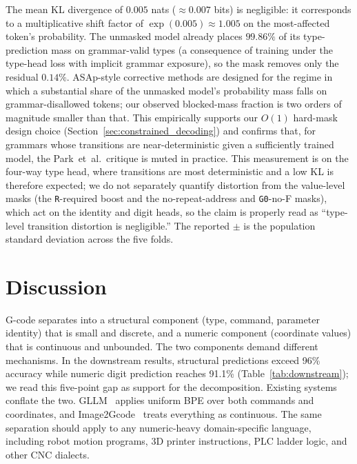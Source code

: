 \documentclass[sensors,article,submit,moreauthors,pdftex]{Definitions/mdpi}
\begin{document}
The mean KL divergence of $0.005$ nats ($\approx 0.007$ bits) is negligible: it corresponds to a multiplicative shift factor of $\exp(0.005) \approx 1.005$ on the most-affected token's probability. The unmasked model already places $99.86\%$ of its type-prediction mass on grammar-valid types (a consequence of training under the type-head loss with implicit grammar exposure), so the mask removes only the residual $0.14\%$. ASAp-style corrective methods are designed for the regime in which a substantial share of the unmasked model's probability mass falls on grammar-disallowed tokens; our observed blocked-mass fraction is two orders of magnitude smaller than that. This empirically supports our $O(1)$ hard-mask design choice (Section~\ref{sec:constrained_decoding}) and confirms that, for grammars whose transitions are near-deterministic given a sufficiently trained model, the Park~et~al.\ critique is muted in practice. This measurement is on the four-way type head, where transitions are most deterministic and a low KL is therefore expected; we do not separately quantify distortion from the value-level masks (the \texttt{R}-required boost and the no-repeat-address and \texttt{G0}-no-F masks), which act on the identity and digit heads, so the claim is properly read as ``type-level transition distortion is negligible.'' The reported $\pm$ is the population standard deviation across the five folds.

\section{Discussion}
\label{sec:discussion}

G-code separates into a structural component (type, command, parameter identity) that is small and discrete, and a numeric component (coordinate values) that is continuous and unbounded. The two components demand different mechanisms. In the downstream results, structural predictions exceed 96\% accuracy while numeric digit prediction reaches 91.1\% (Table~\ref{tab:downstream}); we read this five-point gap as support for the decomposition. Existing systems conflate the two. GLLM~\cite{gllm} applies uniform BPE over both commands and coordinates, and Image2Gcode~\cite{image2gcode} treats everything as continuous. The same separation should apply to any numeric-heavy domain-specific language, including robot motion programs, 3D printer instructions, PLC ladder logic, and other CNC dialects.
\end{document}
